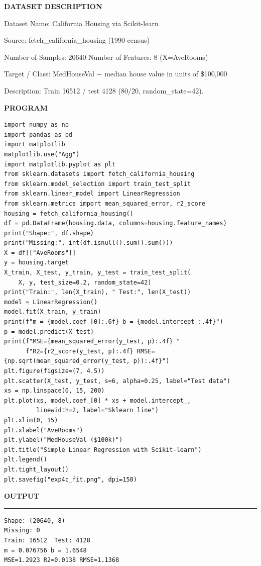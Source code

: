 \documentclass[11pt,twoside]{article}
\newcommand{\expheading}[1]{{\fontsize{14}{17}\selectfont\textbf{#1}\par}}
\newcommand{\tooddpage}{\clearpage\ifodd\value{page}\else\null\thispagestyle{empty}\newpage\fi}
\newcommand{\toevenpage}{\clearpage\ifodd\value{page}\null\thispagestyle{empty}\newpage\fi}
\begin{document}
{\expheading{DATASET DESCRIPTION}
\vspace{4pt}
\noindent Dataset Name: California Housing via Scikit-learn\par
\noindent Source: fetch\_california\_housing (1990 census)\par
\noindent Number of Samples: 20640 \hspace{0.3cm} Number of Features: 8 (X=AveRooms)\par
\noindent Target / Class: MedHouseVal $-$ median house value in units of \$100{,}000\par
\noindent Description: Train 16512 / test 4128 (80/20, random\_state=42). \par
\vspace{4pt}
} %
\toevenpage
\expheading{PROGRAM}
\vspace{6pt}

\begin{lstlisting}
import numpy as np
import pandas as pd
import matplotlib
matplotlib.use("Agg")
import matplotlib.pyplot as plt
from sklearn.datasets import fetch_california_housing
from sklearn.model_selection import train_test_split
from sklearn.linear_model import LinearRegression
from sklearn.metrics import mean_squared_error, r2_score
housing = fetch_california_housing()
df = pd.DataFrame(housing.data, columns=housing.feature_names)
print("Shape:", df.shape)
print("Missing:", int(df.isnull().sum().sum()))
X = df[["AveRooms"]]
y = housing.target
X_train, X_test, y_train, y_test = train_test_split(
    X, y, test_size=0.2, random_state=42)
print("Train:", len(X_train), " Test:", len(X_test))
model = LinearRegression()
model.fit(X_train, y_train)
print(f"m = {model.coef_[0]:.6f} b = {model.intercept_:.4f}")
p = model.predict(X_test)
print(f"MSE={mean_squared_error(y_test, p):.4f} "
      f"R2={r2_score(y_test, p):.4f} RMSE={np.sqrt(mean_squared_error(y_test, p)):.4f}")
plt.figure(figsize=(7, 4.5))
plt.scatter(X_test, y_test, s=6, alpha=0.25, label="Test data")
xs = np.linspace(0, 15, 200)
plt.plot(xs, model.coef_[0] * xs + model.intercept_,
         linewidth=2, label="Sklearn line")
plt.xlim(0, 15)
plt.xlabel("AveRooms")
plt.ylabel("MedHouseVal ($100k)")
plt.title("Simple Linear Regression with Scikit-learn")
plt.legend()
plt.tight_layout()
plt.savefig("exp4c_fit.png", dpi=150)
\end{lstlisting}
\tooddpage
\expheading{OUTPUT}
\vspace{2pt}
\noindent\rule{\textwidth}{0.5pt}\par
\vspace{4pt}
\begin{verbatim}
Shape: (20640, 8)
Missing: 0
Train: 16512  Test: 4128
m = 0.076756 b = 1.6548
MSE=1.2923 R2=0.0138 RMSE=1.1368
\end{verbatim}
\vspace{4pt}
\end{document}
